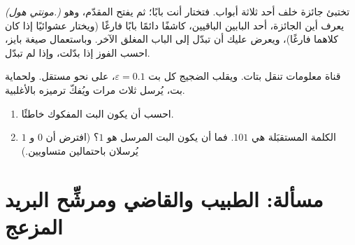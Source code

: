 \begin{exercise}[$\star\star\star$]\label{exo:g12:condprob:7}
\emph{(مونتي هول.)} تختبئ جائزة خلف أحد ثلاثة أبواب. فتختار أنت
بابًا؛ ثم يفتح المقدّم، وهو يعرف أين الجائزة، أحد البابين
الباقيين، كاشفًا دائمًا بابًا فارغًا (ويختار عشوائيًا إذا كان كلاهما
فارغًا)، ويعرض عليك أن تبدّل إلى الباب المغلق الآخر. وباستعمال
صيغة بايز، احسب  الفوز إذا بدّلت، وإذا لم
تبدّل.
\end{exercise}

\begin{exercise}[$\star\star\star$]\label{exo:g12:condprob:8}
قناة معلومات تنقل بتات. ويقلب الضجيج كل بت 
$\varepsilon = 0.1$، على نحو مستقل. ولحماية بت، يُرسل
ثلاث مرات ويُفكّ ترميزه بالأغلبية.
\begin{enumerate}
  \item احسب  أن يكون البت المفكوك خاطئًا.
  \item الكلمة المستقبَلة هي $101$. فما  أن يكون البت المرسل
        هو $1$؟ (افترض أن $0$ و $1$ يُرسلان باحتمالين متساويين.)
\end{enumerate}
\end{exercise}

\section{مسألة: الطبيب والقاضي ومرشِّح البريد المزعج}

